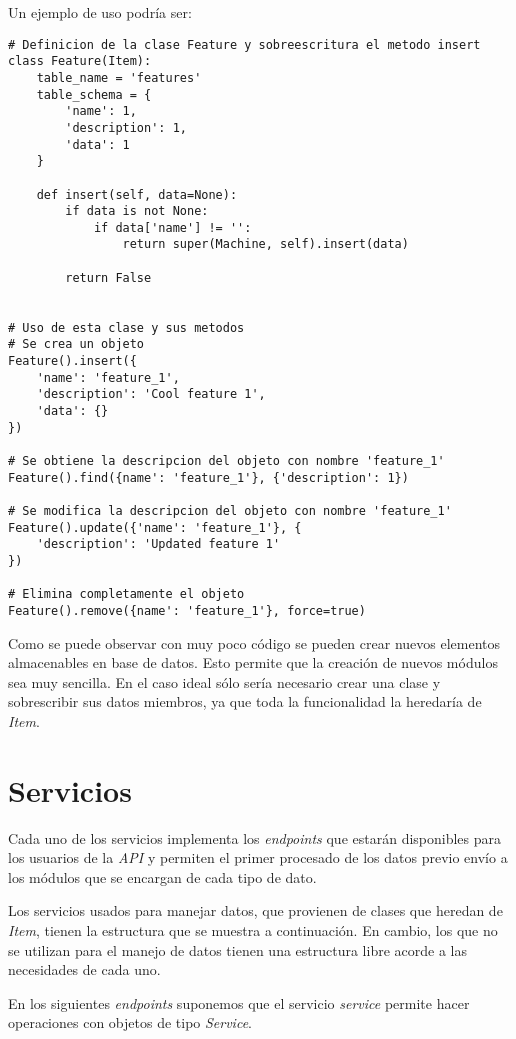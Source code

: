 Un ejemplo de uso podría ser:
\begin{lstlisting}
# Definicion de la clase Feature y sobreescritura el metodo insert
class Feature(Item):
	table_name = 'features'
	table_schema = {
		'name': 1,
		'description': 1,
		'data': 1
	}
	
	def insert(self, data=None):
		if data is not None:
			if data['name'] != '':
				return super(Machine, self).insert(data)
						
		return False


# Uso de esta clase y sus metodos
# Se crea un objeto
Feature().insert({
	'name': 'feature_1',
	'description': 'Cool feature 1',
	'data': {}
})

# Se obtiene la descripcion del objeto con nombre 'feature_1'
Feature().find({name': 'feature_1'}, {'description': 1})

# Se modifica la descripcion del objeto con nombre 'feature_1'
Feature().update({'name': 'feature_1'}, {
	'description': 'Updated feature 1'
})

# Elimina completamente el objeto
Feature().remove({name': 'feature_1'}, force=true)
\end{lstlisting}

Como se puede observar con muy poco código se pueden crear nuevos elementos almacenables en base de datos. Esto permite que la creación de nuevos módulos sea muy sencilla. En el caso ideal sólo sería necesario crear una clase y sobrescribir sus datos miembros, ya que toda la funcionalidad la heredaría de \textit{Item}.

\bigskip

\section{Servicios}
\label{72}
\label{sec:servicios}

Cada uno de los servicios implementa los \textit{endpoints} que estarán disponibles para los usuarios de la \textit{API} y permiten el primer procesado de los datos previo envío a los módulos que se encargan de cada tipo de dato.

Los servicios usados para manejar datos, que provienen de clases que heredan de \textit{Item}, tienen la estructura que se muestra a continuación. En cambio, los que no se utilizan para el manejo de datos tienen una estructura libre acorde a las necesidades de cada uno.

\smallskip
{\scriptsize En los siguientes \textit{endpoints} suponemos que el servicio \textit{service} permite hacer operaciones con objetos de tipo \textit{Service}.}

